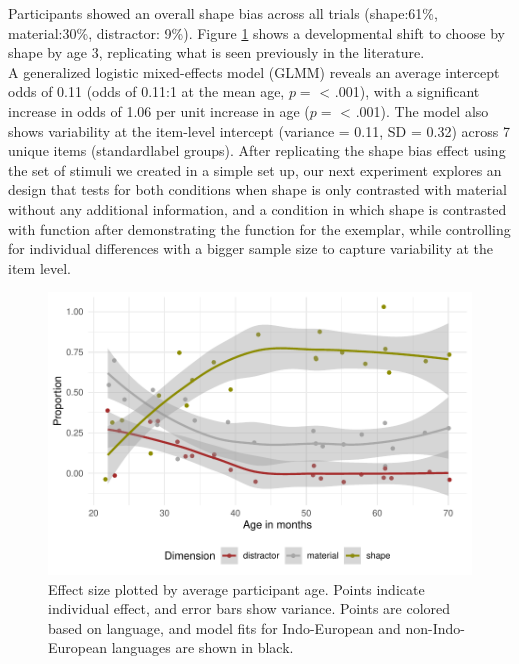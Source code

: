 \documentclass[10pt, letterpaper]{article}
\newenvironment{CodeChunk}{}{}
\begin{document}
Participants showed an overall shape bias across all trials (shape:61\%,
material:30\%, distractor: 9\%). Figure \ref{fig:first_exp} shows a
developmental shift to choose by shape by age 3, replicating what is
seen previously in the literature.\\
A generalized logistic mixed-effects model (GLMM) reveals an average
intercept odds of 0.11 (odds of 0.11:1 at the mean age, \(p=\)
\textless{} .001), with a significant increase in odds of 1.06 per unit
increase in age (\(p=\) \textless{} .001). The model also shows
variability at the item-level intercept (variance = 0.11, SD = 0.32)
across 7 unique items (standardlabel groups). After replicating the
shape bias effect using the set of stimuli we created in a simple set
up, our next experiment explores an design that tests for both
conditions when shape is only contrasted with material without any
additional information, and a condition in which shape is contrasted
with function after demonstrating the function for the exemplar, while
controlling for individual differences with a bigger sample size to
capture variability at the item level.

\begin{CodeChunk}
\begin{figure}[tb]
\includegraphics[width=1\linewidth]{figs/first_exp-1} \caption[Effect size plotted by average participant age]{Effect size plotted by average participant age. Points indicate individual effect, and error bars show variance. Points are colored based on language, and model fits for Indo-European and non-Indo-European languages are shown in black.}\label{fig:first_exp}
\end{figure}
\end{CodeChunk}
\end{document}
